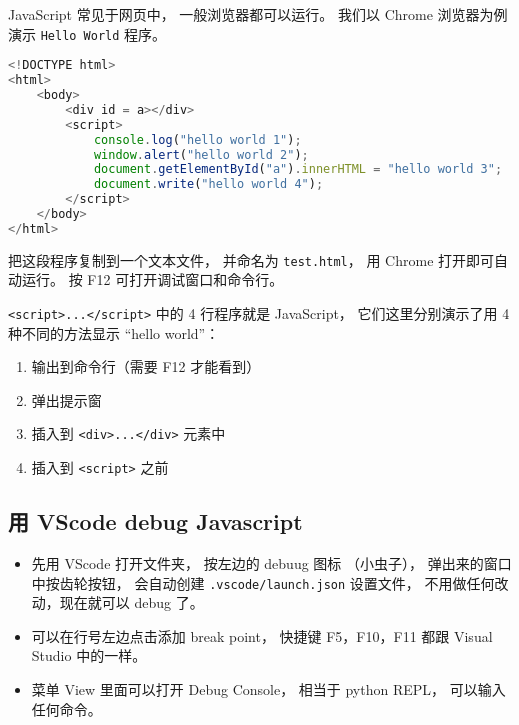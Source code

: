 
JavaScript 常见于网页中， 一般浏览器都可以运行。 我们以 Chrome 浏览器为例演示 \verb|Hello World| 程序。

\begin{lstlisting}[language=js]
<!DOCTYPE html>
<html>
	<body>
		<div id = a></div>
		<script>
            console.log("hello world 1");
            window.alert("hello world 2");
			document.getElementById("a").innerHTML = "hello world 3";
            document.write("hello world 4");
		</script>
	</body>
</html>
\end{lstlisting}
把这段程序复制到一个文本文件， 并命名为 \verb|test.html|， 用 Chrome 打开即可自动运行。 按 F12 可打开调试窗口和命令行。

\verb|<script>...</script>| 中的 4 行程序就是 JavaScript， 它们这里分别演示了用 4 种不同的方法显示 “hello world”：
\begin{enumerate}
\item 输出到命令行（需要 F12 才能看到）
\item 弹出提示窗
\item 插入到 \verb|<div>...</div>| 元素中
\item 插入到 \verb|<script>| 之前
\end{enumerate}

\subsection{用 VScode debug  Javascript}
\begin{itemize}
\item 先用 VScode 打开文件夹， 按左边的 debuug 图标 （小虫子）， 弹出来的窗口中按齿轮按钮， 会自动创建 \verb`.vscode/launch.json` 设置文件， 不用做任何改动，现在就可以 debug 了。
\item 可以在行号左边点击添加 break point， 快捷键 F5，F10，F11 都跟 Visual Studio 中的一样。
\item 菜单 View 里面可以打开 Debug Console， 相当于 python REPL， 可以输入任何命令。
\end{itemize}

